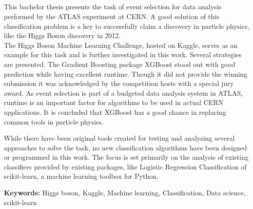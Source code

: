 \begin{titlepage}
\vspace*{\fill}

\section*{}
This bachelor thesis presents the task of event selection for data analysis performed by the ATLAS experiment at CERN. A good solution of this classification problem is a key to successfully claim a discovery in particle physics, like the Higgs Boson discovery in 2012.\\
The Higgs Boson Machine Learning Challenge, hosted on Kaggle, serves as an example for this task and is further investigated in this work. Several strategies are presented. The Gradient Boosting package XGBoost stood out with good prediction while having excellent runtime. Though it did not provide the winning submission it was acknowledged by the competition hosts with a special jury award.
As event selection is part of a budgeted data analysis system in ATLAS, runtime is an important factor for algorithms to be used in actual CERN applications. It is concluded that XGBoost has a good chance in replacing common tools in particle physics.

While there have been original tools created for testing and analysing several approaches to solve the task, no new classification algorithms have been designed or programmed in this work. The focus is set primarily on the analysis of existing classifiers provided by existing packages, like Logistic Regression Classification of scikit-learn, a machine learning toolbox for Python. 

\vspace{25 mm}

\textbf{Keywords:} Higgs  boson, Kaggle, Machine learning, Classification, Data science, scikit-learn

\vspace*{\fill}
\end{titlepage}
